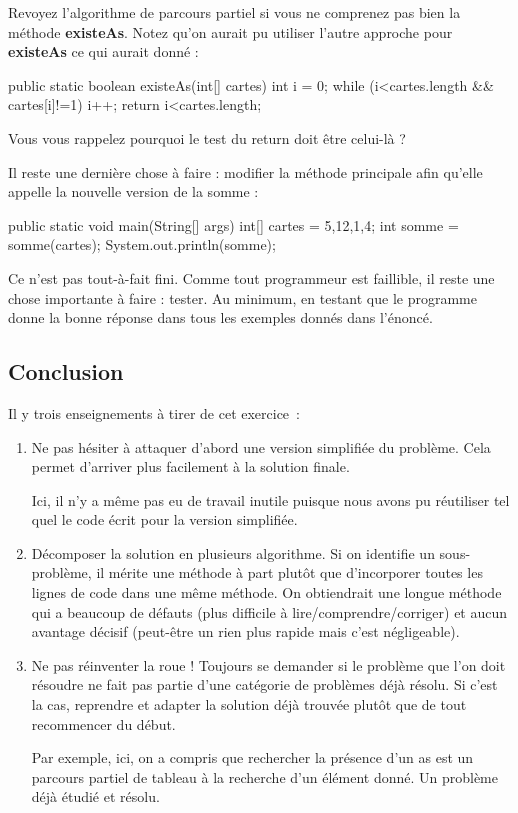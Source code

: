 Revoyez l'algorithme de parcours partiel si vous ne comprenez pas bien
la méthode \textbf{existeAs}. Notez qu'on aurait pu utiliser l'autre
approche pour \textbf{existeAs} ce qui aurait donné :

\begin{java}
public static boolean existeAs(int[] cartes) {
    int i = 0;
    while (i<cartes.length && cartes[i]!=1) {
        i++;
    }
    return i<cartes.length;
}
\end{java}

Vous vous rappelez pourquoi le test du return doit être celui-là ?

Il reste une dernière chose à faire : modifier la méthode principale
afin qu'elle appelle la nouvelle version de la somme :

\begin{java}
public static void main(String[] args) {
    int[] cartes = {5,12,1,4};
    int somme = somme(cartes);
    System.out.println(somme);
}
\end{java}

Ce n'est pas tout-à-fait fini. Comme tout programmeur est faillible, il
reste une chose importante à faire : tester. Au minimum, en testant que
le programme donne la bonne réponse dans tous les exemples donnés dans
l'énoncé.

\subsection{Conclusion}

Il y trois enseignements à tirer de cet exercice~:

\begin{enumerate}

	\item Ne pas hésiter à attaquer d'abord une version simplifiée du problème.
		Cela permet d'arriver plus facilement à la solution finale. 

	Ici, il n'y a même pas eu de travail inutile puisque nous avons pu
	réutiliser tel quel le code écrit pour la version simplifiée. 

	\item Décomposer la solution en plusieurs algorithme. Si on identifie un
		sous-problème, il mérite une méthode à part plutôt que d'incorporer
		toutes les lignes de code dans une même méthode. On obtiendrait une
		longue méthode qui a beaucoup de défauts (plus difficile
		à lire/comprendre/corriger) et aucun avantage décisif (peut-être un
		rien plus rapide mais c'est négligeable). 

	\item Ne pas réinventer la roue ! Toujours se demander si le problème que
		l'on doit résoudre ne fait pas partie d'une catégorie de problèmes déjà
		résolu. Si c'est la cas, reprendre et adapter la solution déjà trouvée
		plutôt que de tout recommencer du début. 

		Par exemple, ici, on a compris que rechercher la présence d'un as est
		un parcours partiel de tableau à la recherche d'un élément donné. Un
		problème déjà étudié et résolu.

\end{enumerate}
